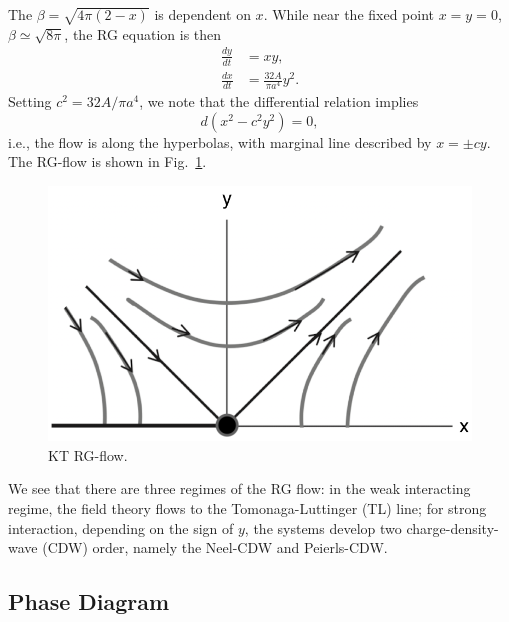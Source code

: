 \documentclass[aps,prb,superscriptaddress,nofootinbib]{revtex4}
\begin{document}
The $\beta = \sqrt{4\pi(2-x)}$ is dependent on $x$.
While near the fixed point $x=y=0$, $\beta \simeq \sqrt{8\pi}$, the RG equation is then
\begin{equation}
\begin{aligned}
	\frac{dy}{dt} &= xy, \\
	\frac{dx}{dt} &= \frac{32 A}{\pi a^4} y^2.
\end{aligned}
\end{equation}
Setting $c^2 = 32A/\pi a^4$, we note that the differential relation implies
\begin{equation}
	d(x^2- c^2 y^2) = 0,
\end{equation}
i.e., the flow is along the hyperbolas, with marginal line described by $x = \pm cy$.
The RG-flow is shown in Fig.~\ref{fig:FL-RG-flow}.

\begin{figure}
	\includegraphics[hsmash=c,width=0.45\linewidth]{pics/LL-RG-flow}
	\caption{KT RG-flow.}
	\label{fig:FL-RG-flow}
\end{figure}

We see that there are three regimes of the RG flow: in the weak interacting regime, the field theory flows to the Tomonaga-Luttinger (TL) line; for strong interaction, depending on the sign of $y$, the systems develop two charge-density-wave (CDW) order, namely the Neel-CDW and Peierls-CDW.


\subsection{Phase Diagram}
\end{document}
